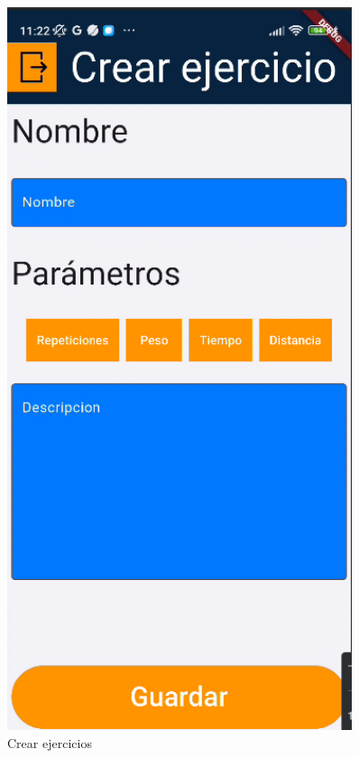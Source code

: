 \begin{figure}[H]
   \centering
   \begin{minipage}{0.45\textwidth}
      \centering
      \includegraphics[width=0.9\textwidth]{pantallas/CrearEjercicio.png}
      \caption{Crear ejercicios}
      \label{fig:CrearEjers}
   \end{minipage}%
   \hspace{0.5cm}

\end{figure}
